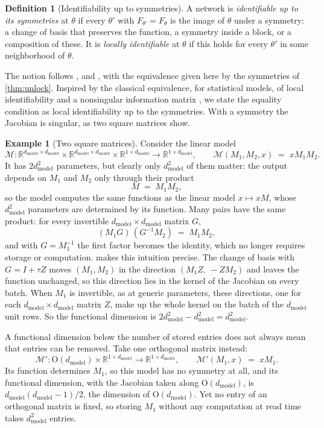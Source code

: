 \documentclass[10pt]{article}
\theoremstyle{definition}
\newtheorem{definition}[theorem]{Definition}
\newtheorem*{example*}{Example}
\theoremstyle{remark}
\newcommand{\R}{\mathbb{R}}
\newcommand{\dm}{d_{\mathrm{model}}}
\newcommand{\Ort}{\mathrm{O}}
\begin{document}
\begin{definition}[Identifiability up to symmetries]\label{def:ident}
A network is \emph{identifiable up to its symmetries} at $\theta$ if every $\theta'$ with $F_{\theta'} = F_\theta$ is the image of $\theta$ under a symmetry: a change of basis that preserves the function, a symmetry inside a block, or a composition of these. It is \emph{locally identifiable} at $\theta$ if this holds for every $\theta'$ in some neighborhood of $\theta$.
\end{definition}

The notion follows \citet{vlacic2020affine}, \citet{stock2021embedding} and \citet{bonapellissier2022local}, with the equivalence given here by the symmetries of \cref{thm:unlock}. Inspired by the classical equivalence, for statistical models, of local identifiability and a nonsingular information matrix \citep{rothenberg1971identification}, we state the equality condition as local identifiability up to the symmetries. With a symmetry the Jacobian is singular, as two square matrices show.

\begin{example*}[Two square matrices]
Consider the linear model
\[
\mathcal{M} \colon \R^{\dm\times\dm} \times \R^{\dm\times\dm} \times \R^{1\times\dm} \to \R^{1\times\dm}, \qquad \mathcal{M}(M_1, M_2, x) \;=\; xM_1M_2 .
\]
It has $2\dm^2$ parameters, but clearly only $\dm^2$ of them matter: the output depends on $M_1$ and $M_2$ only through their product
\[
M \;=\; M_1M_2 ,
\]
so the model computes the same functions as the linear model $x \mapsto xM$, whose $\dm^2$ parameters are determined by its function. Many pairs have the same product: for every invertible $\dm\times\dm$ matrix $G$,
\[
(M_1G)\,(G^{-1}M_2) \;=\; M_1M_2 ,
\]
and with $G = M_1^{-1}$ the first factor becomes the identity, which no longer requires storage or computation.  makes this intuition precise. The change of basis with $G = I + \tau Z$ moves $(M_1, M_2)$ in the direction $(M_1Z,\ -ZM_2)$ and leaves the function unchanged, so this direction lies in the kernel of the Jacobian on every batch. When $M_1$ is invertible, as at generic parameters, these directions, one for each $\dm\times\dm$ matrix $Z$, make up the whole kernel on the batch of the $\dm$ unit rows. So the functional dimension is $2\dm^2 - \dm^2 = \dm^2$.

A functional dimension below the number of stored entries does not always mean that entries can be removed. Take one orthogonal matrix instead:
\[
\mathcal{M}' \colon \Ort(\dm) \times \R^{1\times\dm} \to \R^{1\times\dm}, \qquad \mathcal{M}'(M_1, x) \;=\; xM_1 .
\]
Its function determines $M_1$, so this model has no symmetry at all, and its functional dimension, with the Jacobian taken along $\Ort(\dm)$, is $\dm(\dm-1)/2$, the dimension of $\Ort(\dm)$. Yet no entry of an orthogonal matrix is fixed, so storing $M_1$ without any computation at read time takes $\dm^2$ entries.
\end{example*}
\end{document}
